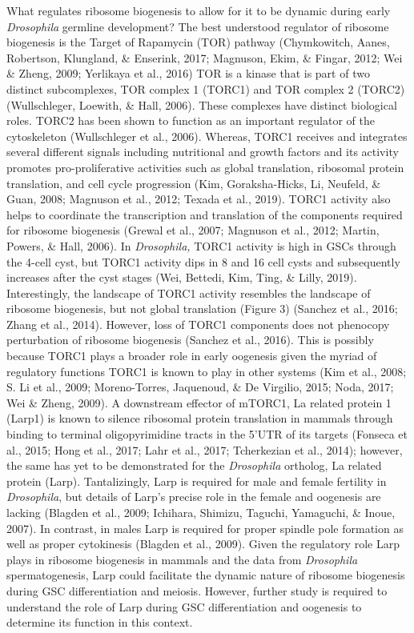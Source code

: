 \documentclass[12pt,oneside]{reedthesis}
\begin{document}
What regulates ribosome biogenesis to allow for it to be dynamic during
early \emph{Drosophila} germline development? The best understood regulator
of ribosome biogenesis is the Target of Rapamycin (TOR) pathway
(Chymkowitch, Aanes, Robertson, Klungland, \& Enserink, 2017; Magnuson, Ekim, \& Fingar, 2012; Wei \& Zheng, 2009; Yerlikaya et al., 2016)
TOR is a kinase that is part of two distinct subcomplexes, TOR complex 1
(TORC1) and TOR complex 2 (TORC2) (Wullschleger, Loewith, \& Hall, 2006). These
complexes have distinct biological roles. TORC2 has been shown to
function as an important regulator of the cytoskeleton
(Wullschleger et al., 2006). Whereas, TORC1 receives and integrates several
different signals including nutritional and growth factors and its
activity promotes pro-proliferative activities such as global
translation, ribosomal protein translation, and cell cycle progression
(Kim, Goraksha-Hicks, Li, Neufeld, \& Guan, 2008; Magnuson et al., 2012; Texada et al., 2019). TORC1 activity also helps
to coordinate the transcription and translation of the components
required for ribosome biogenesis (Grewal et al., 2007; Magnuson et al., 2012; Martin, Powers, \& Hall, 2006). In \emph{Drosophila,} TORC1 activity is high in GSCs through
the 4-cell cyst, but TORC1 activity dips in 8 and 16 cell cysts and
subsequently increases after the cyst stages (Wei, Bettedi, Kim, Ting, \& Lilly, 2019).
Interestingly, the landscape of TORC1 activity resembles the landscape
of ribosome biogenesis, but not global translation (Figure 3)
(Sanchez et al., 2016; Zhang et al., 2014). However, loss of TORC1 components does
not phenocopy perturbation of ribosome biogenesis (Sanchez et al., 2016).
This is possibly because TORC1 plays a broader role in early oogenesis
given the myriad of regulatory functions TORC1 is known to play in other
systems (Kim et al., 2008; S. Li et al., 2009; Moreno-Torres, Jaquenoud, \& De Virgilio, 2015; Noda, 2017; Wei \& Zheng, 2009). A downstream effector of mTORC1, La related protein 1
(Larp1) is known to silence ribosomal protein translation in mammals
through binding to terminal oligopyrimidine tracts in the 5'UTR of its
targets (Fonseca et al., 2015; Hong et al., 2017; Lahr et al., 2017; Tcherkezian et al., 2014); however, the same has yet to be
demonstrated for the \emph{Drosophila} ortholog, La related protein (Larp).
Tantalizingly, Larp is required for male and female fertility in
\emph{Drosophila}, but details of Larp's precise role in the female and
oogenesis are lacking (Blagden et al., 2009; Ichihara, Shimizu, Taguchi, Yamaguchi, \& Inoue, 2007). In contrast,
in males Larp is required for proper spindle pole formation as well as
proper cytokinesis (Blagden et al., 2009). Given the regulatory role Larp
plays in ribosome biogenesis in mammals and the data from \emph{Drosophila}
spermatogenesis, Larp could facilitate the dynamic nature of ribosome
biogenesis during GSC differentiation and meiosis. However, further
study is required to understand the role of Larp during GSC
differentiation and oogenesis to determine its function in this context.
\end{document}
